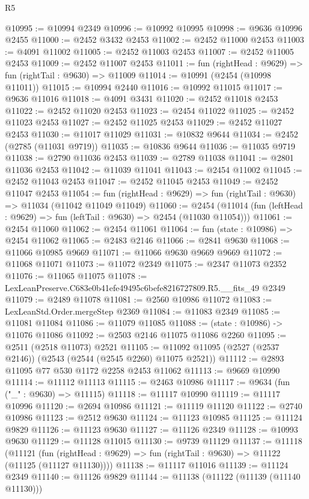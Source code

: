 \begin{lexlean}{R5}
\begin{coremodule}
@10995 := @10994 @2349
@10996 := @10992 @10995
@10998 := @9636 @10996 @2455
@11000 := @2452 @3432 @2453
@11002 := @2452 @11000 @2453
@11003 := @4091 @11002
@11005 := @2452 @11003 @2453
@11007 := @2452 @11005 @2453
@11009 := @2452 @11007 @2453
@11011 := fun (rightHead : @9629) => fun (rightTail : @9630) => @11009
@11014 := @10991 (@2454 (@10998 @11011))
@11015 := @10994 @2440
@11016 := @10992 @11015
@11017 := @9636 @11016
@11018 := @4091 @3431
@11020 := @2452 @11018 @2453
@11022 := @2452 @11020 @2453
@11023 := @2454 @11022
@11025 := @2452 @11023 @2453
@11027 := @2452 @11025 @2453
@11029 := @2452 @11027 @2453
@11030 := @11017 @11029
@11031 := @10832 @9644
@11034 := @2452 (@2785 (@11031 @9719))
@11035 := @10836 @9644
@11036 := @11035 @9719
@11038 := @2790 @11036 @2453
@11039 := @2789 @11038
@11041 := @2801 @11036 @2453
@11042 := @11039 @11041
@11043 := @2454 @11002
@11045 := @2452 @11043 @2453
@11047 := @2452 @11045 @2453
@11049 := @2452 @11047 @2453
@11054 := fun (rightHead : @9629) => fun (rightTail : @9630) => @11034 (@11042 @11049 @11049)
@11060 := @2454 (@11014 (fun (leftHead : @9629) => fun (leftTail : @9630) => @2454 (@11030 @11054)))
@11061 := @2454 @11060
@11062 := @2454 @11061
@11064 := fun (state : @10986) => @2454 @11062
@11065 := @2483 @2146
@11066 := @2841 @9630
@11068 := @11066 @10985 @9669
@11071 := @11066 @9630 @9669 @9669
@11072 := @11068 @11071
@11073 := @11072 @2349
@11075 := @2347 @11073 @2352
@11076 := @11065 @11075
@11078 := LexLeanPreserve.C683e0b41efe49495c6befe8216727809.R5.__fits_49 @2349
@11079 := @2489 @11078
@11081 := @2560 @10986 @11072
@11083 := LexLeanStd.Order.mergeStep @2369
@11084 := @11083 @2349
@11085 := @11081 @11084
@11086 := @11079 @11085
@11088 := (state : @10986) -> @11076 @11086
@11092 := @2503 @2146 @11075 @11086 @2260
@11095 := @2511 (@2518 @11073) @2521
@11105 := @11092 @11095 (@2527 (@2537 @2146)) (@2543 (@2544 (@2545 @2260) @11075 @2521))
@11112 := @2893 @11095 @77 @530 @1172 @2258 @2453 @11062
@11113 := @9669 @10990
@11114 := @11112 @11113
@11115 := @2463 @10986
@11117 := @9634 (fun ("_" : @9630) => @11115)
@11118 := @11117 @10990
@11119 := @11117 @10996
@11120 := @2694 @10986
@11121 := @11119 @11120
@11122 := @2740 @10986
@11123 := @2512 @9630
@11124 := @11123 @10985
@11125 := @11124 @9829
@11126 := @11123 @9630
@11127 := @11126 @2349
@11128 := @10993 @9630
@11129 := @11128 @11015
@11130 := @9739 @11129
@11137 := @11118
    (@11121 (fun (rightHead : @9629) => fun (rightTail : @9630) => @11122 (@11125 (@11127 @11130))))
@11138 := @11117 @11016
@11139 := @11124 @2349
@11140 := @11126 @9829
@11144 := @11138 (@11122 (@11139 (@11140 @11130)))

\end{coremodule}
\end{lexlean}
